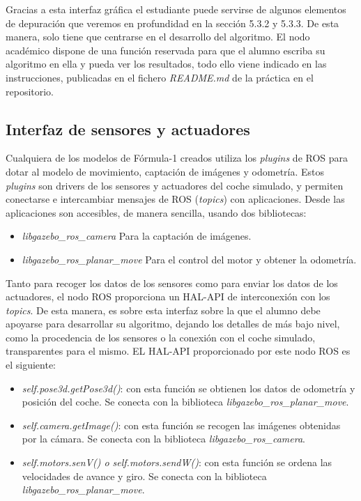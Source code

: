 Gracias a esta interfaz gráfica el estudiante puede servirse de algunos elementos de depuración que veremos en profundidad en la sección 5.3.2 y 5.3.3. De esta manera, solo tiene que centrarse en el desarrollo del algoritmo. El nodo académico dispone de una función reservada para que el alumno escriba su algoritmo en ella y pueda ver los resultados, todo ello viene indicado en las instrucciones, publicadas en el fichero \textit{README.md} de la práctica en el repositorio.

\subsection{Interfaz de sensores y actuadores}
Cualquiera de los modelos de Fórmula-1 creados utiliza los \textit{plugins} de ROS para dotar al modelo de movimiento, captación de imágenes y odometría. Estos \textit{plugins} son drivers de los sensores y actuadores del coche simulado, y permiten conectarse e intercambiar mensajes de ROS (\textit{topics}) con aplicaciones. Desde las aplicaciones son accesibles, de manera sencilla, usando dos bibliotecas:
\begin{itemize}
	\item \textit{libgazebo\_ros\_camera}
Para la captación de imágenes.
	\item \textit{libgazebo\_ros\_planar\_move}
Para el control del motor y obtener la odometría.
\end{itemize}

Tanto para recoger los datos de los sensores como para enviar los datos de los actuadores, el nodo ROS proporciona un HAL-API de interconexión con los \textit{topics}. De esta manera, es sobre esta interfaz sobre la que el alumno debe apoyarse para desarrollar su algoritmo, dejando los detalles de más bajo nivel, como la procedencia de los sensores o la conexión con el coche simulado, transparentes para el mismo. EL HAL-API proporcionado por este nodo ROS es el siguiente:

\begin{itemize}
	\item \textit{self.pose3d.getPose3d()}: con esta función se obtienen los datos de odometría y posición del coche. Se conecta con la biblioteca \textit{libgazebo\_ros\_planar\_move}.
	\item \textit{self.camera.getImage()}: con esta función se recogen las imágenes obtenidas por la cámara. Se conecta con la biblioteca \textit{libgazebo\_ros\_camera}.
	\item \textit{self.motors.senV() o self.motors.sendW()}: con esta función se ordena las velocidades de avance y giro. Se conecta con la biblioteca \textit{libgazebo\_ros\_planar\_move}.
\end{itemize}


